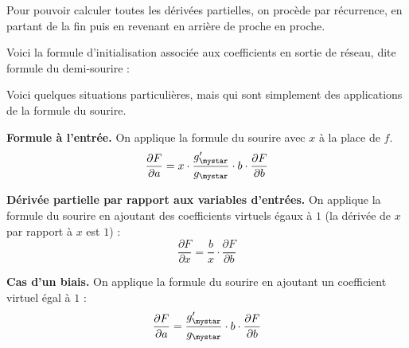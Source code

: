 \documentclass[11pt,class=report,crop=false]{standalone}
\begin{document}
Pour pouvoir calculer toutes les dérivées partielles, on procède par récurrence, en partant de la fin puis en revenant en arrière de proche en proche. 


Voici la formule d'initialisation associée aux coefficients en sortie de réseau, dite \og{}formule du demi-sourire\fg{} :


\bigskip

Voici quelques situations particulières, mais qui sont simplement des applications de la formule du sourire.

\textbf{Formule à l'entrée.} On applique la formule du sourire avec $x$ à la place de $f$.
$$\frac{\partial F}{\partial a} = x \cdot \frac{g'_\mystar}{g_\mystar} \cdot b \cdot \frac{\partial F}{\partial b}$$ 

\textbf{Dérivée partielle par rapport aux variables d'entrées.}
On applique la formule du sourire en ajoutant des coefficients virtuels égaux à $1$ (la dérivée de $x$ par rapport à $x$ est $1$) :
$$\frac{\partial F}{\partial x} = \frac{b}{x} \cdot \frac{\partial F}{\partial b}$$


\textbf{Cas d'un biais.} On applique la formule du sourire en ajoutant un coefficient virtuel égal à $1$ :
$$\frac{\partial F}{\partial a} = \frac{g'_\mystar}{g_\mystar} \cdot b \cdot \frac{\partial F}{\partial b}$$ 
\end{document}
